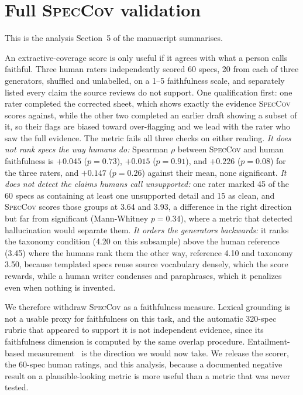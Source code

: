 \documentclass[11pt]{article}
\begin{document}
\section{Full \textsc{SpecCov} validation}

This is the analysis Section~5 of the manuscript summarises.


An extractive-coverage score is only useful if it agrees with what a person calls faithful. Three
human raters independently scored 60 specs, 20 from each of three generators, shuffled and
unlabelled, on a 1--5 faithfulness scale, and separately listed every claim the source reviews do
not support. One qualification first: one rater completed the corrected sheet, which shows exactly
the evidence \textsc{SpecCov} scores against, while the other two completed an earlier draft
showing a subset of it, so their flags are biased toward over-flagging and we lead with the rater
who saw the full evidence. The metric fails all three checks on either reading. \emph{It does not
rank specs the way humans do:} Spearman $\rho$ between \textsc{SpecCov} and human faithfulness is
$+0.045$ ($p = 0.73$), $+0.015$ ($p = 0.91$), and $+0.226$ ($p = 0.08$) for the three raters, and
$+0.147$ ($p = 0.26$) against their mean, none significant. \emph{It does not detect the claims
humans call unsupported:} one rater marked 45 of the 60 specs as containing at least one
unsupported detail and 15 as clean, and \textsc{SpecCov} scores those groups at 3.64 and 3.93, a
difference in the right direction but far from significant (Mann-Whitney $p = 0.34$), where a
metric that detected hallucination would separate them. \emph{It orders the generators
backwards:} it ranks the taxonomy condition (4.20 on this subsample) above the human reference
(3.45) where the humans rank them the other way, reference 4.10 and taxonomy 3.50, because
templated specs reuse source vocabulary densely, which the score rewards, while a human writer
condenses and paraphrases, which it penalizes even when nothing is invented.

We therefore withdraw \textsc{SpecCov} as a faithfulness measure. Lexical grounding is not a
usable proxy for faithfulness on this task, and the automatic 320-spec rubric that appeared to
support it is not independent evidence, since its faithfulness dimension is computed by the same
overlap procedure. Entailment-based measurement~\cite{laban2022summac, honovich2022true,
durmus2020feqa} is the direction we would now take. We release the scorer, the 60-spec human
ratings, and this analysis, because a documented negative result on a plausible-looking metric
is more useful than a metric that was never tested.
\end{document}
